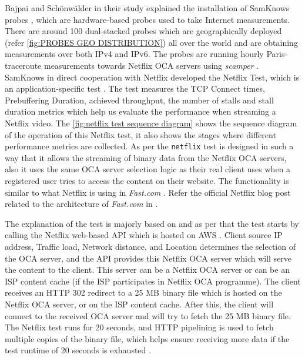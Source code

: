 Bajpai and Schönwälder in their study \cite{bajpaisurvey} explained the installation of SamKnows probes \cite{samknows}, 
which are hardware-based probes used to take Internet measurements. There are around 100 dual-stacked probes which are geographically deployed (refer \cref{fig:PROBES GEO DISTRIBUTION}) 
all over the world and are obtaining measurements over both IPv4 and IPv6. The probes are running hourly Paris-traceroute \cite{paris} measurements towards Netflix OCA servers using \textit{scamper} \cite{scamper}. 
SamKnows \cite{samknows} in direct cooperation with Netflix \cite{netflix} developed the Netflix Test, 
which is an application-specific test \cite{samknowswhitepaper}. The test measures the TCP Connect times, Prebuffering Duration, achieved throughput, the number of stalls and stall duration metrics
which help us evaluate the performance when streaming a Netflix video. The \cref{fig:netflix test sequence diagram} shows the sequence diagram of the operation of this Netflix test, it also
shows the stages where different performance metrics are collected. As per \cite{samknowswhitepaper} the \texttt{netflix} test is designed in such a way that it allows the streaming of binary data
from the Netflix OCA servers, also it uses the same OCA server selection logic as their real client uses when a registered user tries to access the content on their website. The functionality is
similar to what Netflix is using in \textit{Fast.com} \cite{fastcom}. Refer the official Netflix blog post related to the architecture of \textit{Fast.com} in \cite{netflixfast}. 

The explanation of the test is majorly based on \cite{samknowswhitepaper} and as per that the test starts by calling the Netflix web-based API which is hosted on AWS \cite{ocaoverview}.
Client source IP address, Traffic load, Network distance, and Location determines the selection of the OCA server, and the API provides this Netflix OCA server which will serve the content to the client.
This server can be a Netflix OCA server or can be an ISP content cache (if the ISP participates in Netflix OCA programme). The client receives an HTTP 302 redirect to a 25 MB binary file which is hosted on the Netflix OCA server, 
or on the ISP content cache.  After this, the client will connect to the received OCA server and will try to fetch the 25 MB binary file. The Netflix test runs for 20 seconds, and HTTP pipelining is used to fetch multiple copies of the binary file, which helps ensure receiving more data if the test runtime of 20 seconds is exhausted \cite{samknowswhitepaper}. 

